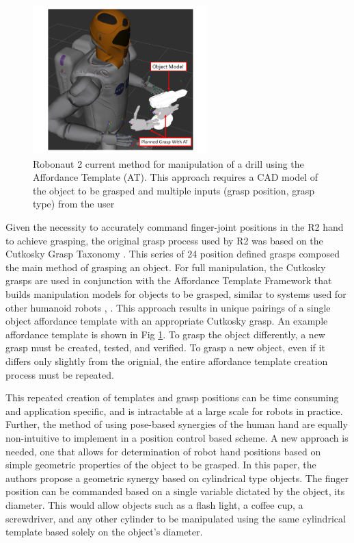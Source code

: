 \documentclass[runningheads,a4paper]{llncs}
\begin{document}
  \begin{figure}[!b]
   \centering
   \includegraphics[width=0.6\textwidth]{drill_at2}
   \caption{Robonaut 2 current method for manipulation of a drill using the Affordance Template (AT). This approach requires a CAD model of the object to be grasped and multiple inputs (grasp position, grasp type) from the user}
   \label{at_example}
  \end{figure}

Given the necessity to accurately command finger-joint positions in the R2 hand to achieve grasping, the original grasp process used by R2 was based on the Cutkosky Grasp Taxonomy \cite{Cutkosky}. This series of 24 position defined grasps composed the main method of grasping an object. For full manipulation, the Cutkosky grasps are used in conjunction with the Affordance Template Framework \cite{affordance_templates} that builds manipulation models for objects to be grasped, similar to systems used for other humanoid robots \cite{DRC_Yanco}, \cite{IHMC}. 
This approach results in unique pairings of a single object affordance template with an appropriate Cutkosky grasp. An example affordance template is shown in Fig \ref{at_example}. To grasp the object differently, a new grasp must be created, tested, and verified. To grasp a new object, even if it differs only slightly from the orignial, the entire affordance template creation process must be repeated. 

This repeated creation of templates and grasp positions can be time consuming and application specific, and is intractable at a large scale for robots in practice. Further, the method of using pose-based synergies of the human hand are equally non-intuitive to implement in a position control based scheme. A new approach is needed, one that allows for determination of robot hand positions based on simple geometric properties of the object to be grasped. In this paper, the authors propose a geometric synergy based on cylindrical type objects. The finger position can be commanded based on a single variable dictated by the object, its diameter. This would allow objects such as a flash light, a coffee cup, a screwdriver, and any other cylinder to be manipulated using the same cylindrical template based solely on the object's diameter. 
\end{document}
